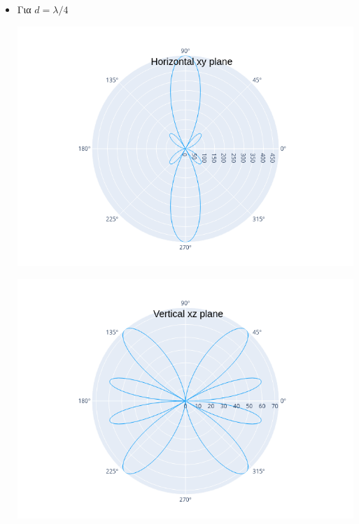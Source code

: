 \documentclass[12pt]{article}
\begin{document}
\begin{itemize}
    \item Για \(d = \lambda/4\)
    \begin{center}
        \includegraphics*[scale=0.6]{025xy.png}
    \end{center}
    \begin{center}
        \includegraphics*[scale=0.6]{025xz.png}
    \end{center}


\end{itemize}
\end{document}
